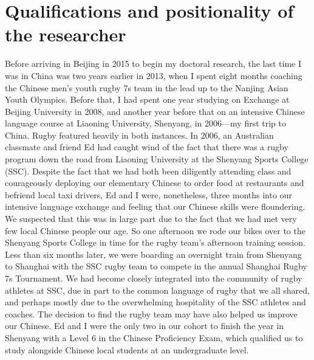 {\section{Qualifications and positionality of the researcher}

Before arriving in Beijing in 2015 to begin my doctoral research, the last time I was in China was two years earlier in 2013, when I spent eight months coaching the Chinese men's youth rugby 7s team in the lead up to the Nanjing Asian Youth Olympics.  Before that, I had spent one year studying on Exchange at Beijing University in 2008, and another year before that on an intensive Chinese language course at Liaoning University, Shenyang, in 2006---my first trip to China.  Rugby featured heavily in both instances.  In 2006, an Australian classmate and friend Ed had caught wind of the fact that there was a rugby program down the road from Liaoning University at the Shenyang Sports College (SSC).  Despite the fact that we had both been diligently attending class and courageously deploying our elementary Chinese to order food at restaurants and befriend local taxi drivers, Ed and I were, nonetheless, three months into our intensive language exchange and feeling that our Chinese skills were floundering.  We suspected that this was in large part due to the fact that we had met very few local Chinese people our age.  So one afternoon we rode our bikes over to the Shenyang Sports College in time for the rugby team's afternoon training session.  Less than six months later, we were boarding an overnight train from Shenyang to Shanghai with the SSC rugby team to compete in the annual Shanghai Rugby 7s Tournament.  We had become closely integrated into the community of rugby athletes at SSC, due in part to the common language of rugby that we all shared, and perhaps mostly due to the overwhelming hospitality of the SSC athletes and coaches.  The decision to find the rugby team may have also helped us improve our Chinese. Ed and I were the only two in our cohort to finish the year in Shenyang with a Level 6 in the Chinese Proficiency Exam, which qualified us to study alongside Chinese local students at an undergraduate level.

}
